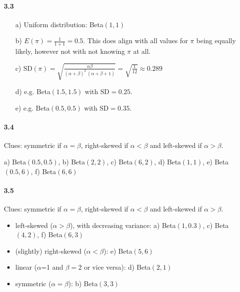 \documentclass[fontsize=11pt,DIV=18,parskip=half]{scrartcl}
\begin{document}
\paragraph{3.3}
\begin{enumerate}
\item[a)] Uniform distribution: Beta$(1,1)$
\item[b)] $E(\pi) = \frac{1}{1+1} = 0.5$. This does align with all values for $\pi$ being equally likely, however not with not knowing $\pi$ at all.
\item[c)] SD$(\pi) = \sqrt{\frac{\alpha\beta}{(\alpha+\beta)^2\,(\alpha+\beta+1)}} = \sqrt{\frac{1}{12}} \approx 0.289$
\item[d)] e.g. Beta$(1.5,1.5)$ with $\text{SD} = 0.25$.
\item[e)] e.g. Beta$(0.5,0.5)$ with $\text{SD} = 0.35$.
\end{enumerate}

\paragraph{3.4} Clues: symmetric if $\alpha=\beta$, right-skewed if $\alpha<\beta$ and left-skewed if $\alpha>\beta$.

a) Beta$(0.5,0.5)$, b) Beta$(2,2)$, c) Beta$(6,2)$, d) Beta$(1,1)$, e) Beta$(0.5,6)$, f) Beta$(6,6)$


\paragraph{3.5} Clues: symmetric if $\alpha=\beta$, right-skewed if $\alpha<\beta$ and left-skewed if $\alpha>\beta$.

\begin{itemize}
\item left-skewed ($\alpha>\beta$), with decreasing variance: a) Beta$(1,0.3)$, c) Beta$(4,2)$, f) Beta$(6,3)$
\item (slightly) right-skewed ($\alpha<\beta$): e) Beta$(5,6)$
\item linear ($\alpha$=1 and $\beta=2$ or vice versa): d) Beta$(2,1)$ 
\item symmetric ($\alpha=\beta$): b) Beta$(3,3)$ 
\end{itemize}
\end{document}

